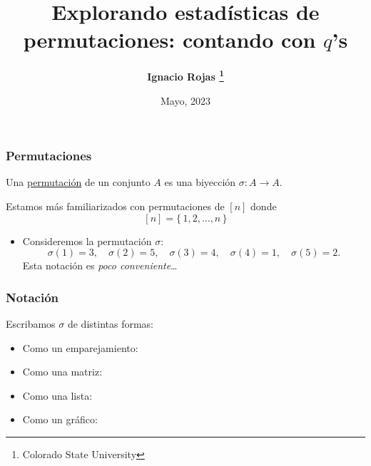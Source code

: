 \documentclass[grey]{beamer}
\title[Coloquio: $q$-análogos]{Explorando estadísticas de permutaciones: contando con $q$'s}
\author[I. Rojas]{\bf Ignacio Rojas \thanks{Colorado State University}}
\date{Mayo, 2023}
\newcommand{\sg}{\sigma}
\newcommand{\set}[1]{\{\,#1\,\}}    %
\begin{document}
\maketitle


\begin{frame}[t]\frametitle{Permutaciones}
\begin{definition}
Una \underline{permutación} de un conjunto $A$ es una biyección $\sg:A\to A$.
\end{definition}\pause

Estamos más familiarizados con permutaciones de $[n]$ donde 
$$[n]=\set{1,2,\dots,n}$$\pause

\begin{itemize}
  \item Consideremos la permutación $\sg$:
  $$\sg(1)=3,\quad\sg(2)=5,\quad\sg(3)=4,\quad\sg(4)=1,\quad\sg(5)=2.$$
  Esta notación es \emph{poco conveniente}\dots
\end{itemize}

\end{frame}

\begin{frame}[t]\frametitle{Notación}
Escribamos $\sg$ de distintas formas:\pause
\begin{itemize}[<+->]
  \item Como un emparejamiento:\vspace{3em}
  \item Como una matriz:\vspace{3em}
  \item Como una lista:\vspace{3em}
  \item Como un gráfico:
\end{itemize}

\end{frame}
  
\end{document}
